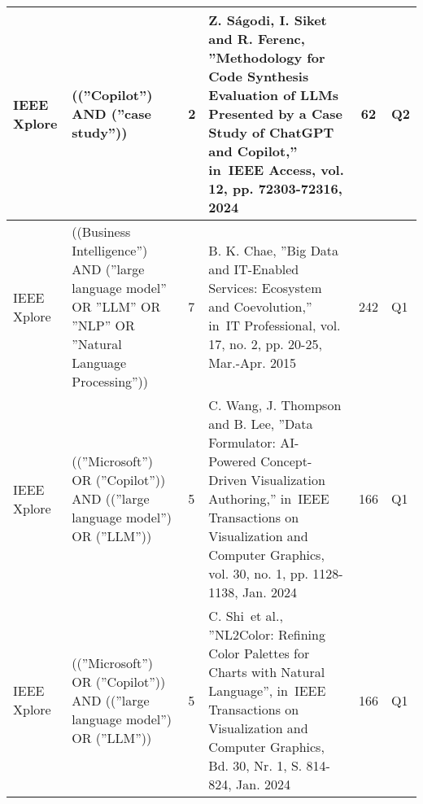 \begin{scriptsize}
\begin{longtable}{|p{1cm}|p{3cm}|C{1.1cm}|p{4cm}|c|C{1.2cm}|}
    \hline
    IEEE Xplore & ((''Copilot'') AND (''case study'')) & 2 & Z. Ságodi, I. Siket and R. Ferenc, ''Methodology for Code Synthesis Evaluation of LLMs Presented by a Case Study of ChatGPT and Copilot,'' in IEEE Access, vol. 12, pp. 72303-72316, 2024 & 62 & Q2 \\
    \hline
    IEEE Xplore & ((Business Intelligence'') AND (''large language model'' OR ''LLM'' OR ''NLP'' OR ''Natural Language Processing'')) & 7 & B. K. Chae, ''Big Data and IT-Enabled Services: Ecosystem and Coevolution,'' in IT Professional, vol. 17, no. 2, pp. 20-25, Mar.-Apr. 2015 & 242 & Q1 \\
    \hline
    IEEE Xplore & ((''Microsoft'') OR (''Copilot'')) AND ((''large language model'') OR (''LLM'')) & 5 & C. Wang, J. Thompson and B. Lee, ''Data Formulator: AI-Powered Concept-Driven Visualization Authoring,'' in IEEE Transactions on Visualization and Computer Graphics, vol. 30, no. 1, pp. 1128-1138, Jan. 2024 & 166 & Q1 \\
    \hline
    IEEE Xplore & ((''Microsoft'') OR (''Copilot'')) AND ((''large language model'') OR (''LLM'')) & 5 & C. Shi et al., ''NL2Color: Refining Color Palettes for Charts with Natural Language'', in IEEE Transactions on Visualization and Computer Graphics, Bd. 30, Nr. 1, S. 814-824, Jan. 2024 & 166 & Q1 \\
    \hline
\end{longtable}
\end{scriptsize}

\clearpage